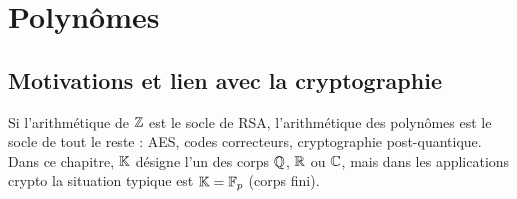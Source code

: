 \chapter{Polynômes}

\section{Motivations et lien avec la cryptographie}

Si l'arithmétique de $\mathbb{Z}$ est le socle de RSA, l'arithmétique des polynômes est le socle de tout le reste : AES, codes correcteurs, cryptographie post-quantique. Dans ce chapitre, $\mathbb{K}$ désigne l'un des corps $\mathbb{Q}$, $\mathbb{R}$ ou $\mathbb{C}$, mais dans les applications crypto la situation typique est $\mathbb{K} = \mathbb{F}_p$ (corps fini).

